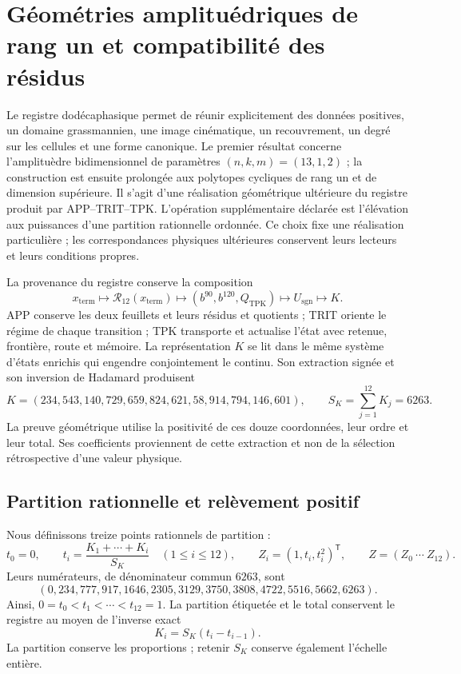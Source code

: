\section{Géométries amplituédriques de rang un et compatibilité des résidus}
\label{sec:k-poligono-amplituhedral}

Le registre dodécaphasique permet de réunir explicitement des données positives,
un domaine grassmannien, une image cinématique, un recouvrement, un degré sur les cellules
et une forme canonique. Le premier résultat concerne l’amplituèdre
bidimensionnel de paramètres \((n,k,m)=(13,1,2)\) ; la construction est ensuite
prolongée aux polytopes cycliques de rang un et de dimension supérieure.
Il s’agit d’une réalisation géométrique ultérieure du registre produit
par APP--TRIT--TPK. L’opération supplémentaire déclarée est l’élévation aux
puissances d’une partition rationnelle ordonnée. Ce choix fixe une
réalisation particulière ; les correspondances physiques ultérieures conservent
leurs lecteurs et leurs conditions propres.

La provenance du registre conserve la composition
\[
 x_{\mathrm{term}}\longmapsto\mathcal R_{12}(x_{\mathrm{term}})
 \longmapsto(b^{90},b^{120},Q_{\mathrm{TPK}})
 \longmapsto U_{\mathrm{sgn}}\longmapsto K.
\]
APP conserve les deux feuillets et leurs résidus et quotients ; TRIT oriente le régime de chaque transition ; TPK transporte et actualise l'état avec retenue, frontière, route et mémoire. La représentation \(K\) se lit dans le même système d'états enrichis qui engendre conjointement le continu. Son extraction signée et son inversion de Hadamard produisent
\begin{equation}
 K=(234,543,140,729,659,824,621,58,914,794,146,601),
 \qquad S_K=\sum_{j=1}^{12}K_j=6263.
 \label{eq:polygon-K}
\end{equation}
La preuve géométrique utilise la positivité de ces douze coordonnées, leur
ordre et leur total. Ses coefficients proviennent de cette extraction et non de
la sélection rétrospective d’une valeur physique.

\subsection{Partition rationnelle et relèvement positif}

Nous définissons treize points rationnels de partition :
\begin{equation}
 t_0=0,\qquad t_i=\frac{K_1+\cdots+K_i}{S_K}\quad(1\leq i\leq12),
 \qquad Z_i=(1,t_i,t_i^2)^\mathsf T,\qquad Z=(Z_0\ \cdots\ Z_{12}).
 \label{eq:polygon-Z}
\end{equation}
Leurs numérateurs, de dénominateur commun \(6263\), sont
\[
 (0,234,777,917,1646,2305,3129,3750,3808,4722,5516,5662,6263).
\]
Ainsi, \(0=t_0<t_1<\cdots<t_{12}=1\). La partition étiquetée et le total conservent le registre au moyen de l'inverse exact
\begin{equation}
 K_i=S_K(t_i-t_{i-1}).
 \label{eq:polygon-recover-K}
\end{equation}
La partition conserve les proportions ; retenir \(S_K\) conserve également
l’échelle entière.

